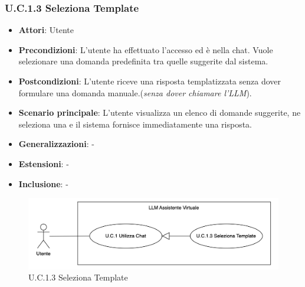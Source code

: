 \subsubsection{U.C.1.3 Seleziona Template}
\begin{itemize}
    \item \textbf{Attori}: Utente
    \item \textbf{Precondizioni}: L'utente ha effettuato l'accesso ed è nella chat. Vuole selezionare una domanda predefinita tra quelle suggerite dal sistema. 
    \item \textbf{Postcondizioni}: L'utente riceve una risposta templatizzata senza dover formulare una domanda manuale.(\textit{senza dover chiamare l’LLM}).
    \item \textbf{Scenario principale}: L'utente visualizza un elenco di domande suggerite, ne seleziona una e il sistema fornisce immediatamente una risposta.
    \item \textbf{Generalizzazioni}: -
    \item \textbf{Estensioni}: -
    \item \textbf{Inclusione}: -
\end{itemize}
\begin{figure}[H]
    \centering
    \includegraphics[width=\textwidth]{img/U.C.1.3.png}
    \caption{U.C.1.3 Seleziona Template}
\end{figure}
\newpage


